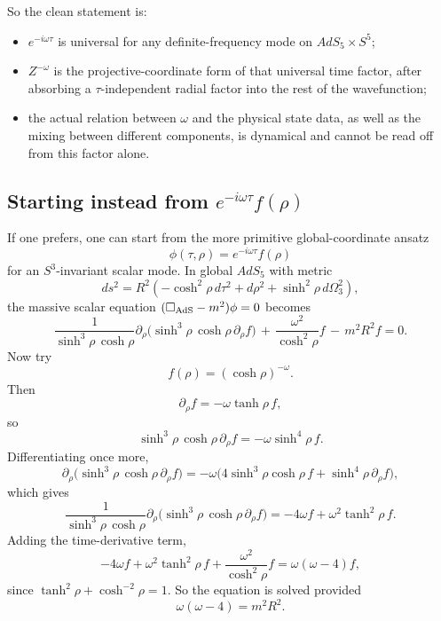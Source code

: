 \documentclass[12pt]{article}
\begin{document}
So the clean statement is:
\begin{itemize}
\item $e^{-i\omega\tau}$ is universal for any definite-frequency mode on $AdS_5\times S^5$;
\item $Z^{-\omega}$ is the projective-coordinate form of that universal time factor, after absorbing a
      $\tau$-independent radial factor into the rest of the wavefunction;
\item the actual relation between $\omega$ and the physical state data, as well as the mixing between
      different components, is dynamical and cannot be read off from this factor alone.
\end{itemize}

\subsection*{Starting instead from \texorpdfstring{$e^{-i\omega\tau}f(\rho)$}{exp(-i omega tau) f(rho)}}

If one prefers, one can start from the more primitive global-coordinate ansatz
\begin{equation}
\phi(\tau,\rho)=e^{-i\omega\tau}f(\rho)
\end{equation}
for an $S^3$-invariant scalar mode.  In global $AdS_5$ with metric
\begin{equation}
ds^2=R^2\left(-\cosh^2\rho\,d\tau^2+d\rho^2+\sinh^2\rho\,d\Omega_3^2\right),
\end{equation}
the massive scalar equation $(\Box_{\rm AdS}-m^2)\phi=0$ becomes
\begin{equation}
\frac{1}{\sinh^3\rho\,\cosh\rho}\partial_\rho
\Big(\sinh^3\rho\,\cosh\rho\,\partial_\rho f\Big)
\,+\,\frac{\omega^2}{\cosh^2\rho}f
\,-\,m^2R^2 f
=
0.
\end{equation}
Now try
\begin{equation}
f(\rho)=(\cosh\rho)^{-\omega}.
\end{equation}
Then
\[
\partial_\rho f=-\omega\tanh\rho\,f,
\]
so
\[
\sinh^3\rho\,\cosh\rho\,\partial_\rho f
=
-\omega\sinh^4\rho\,f.
\]
Differentiating once more,
\[
\partial_\rho\Big(\sinh^3\rho\,\cosh\rho\,\partial_\rho f\Big)
=
-\omega\Big(4\sinh^3\rho\cosh\rho\,f+\sinh^4\rho\,\partial_\rho f\Big),
\]
which gives
\[
\frac{1}{\sinh^3\rho\,\cosh\rho}\partial_\rho
\Big(\sinh^3\rho\,\cosh\rho\,\partial_\rho f\Big)
=
-4\omega f+\omega^2\tanh^2\rho\,f.
\]
Adding the time-derivative term,
\[
-4\omega f+\omega^2\tanh^2\rho\,f+\frac{\omega^2}{\cosh^2\rho}f
=
\omega(\omega-4)f,
\]
since $\tanh^2\rho+\cosh^{-2}\rho=1$.  So the equation is solved provided
\begin{equation}
\omega(\omega-4)=m^2R^2.
\end{equation}
\end{document}
